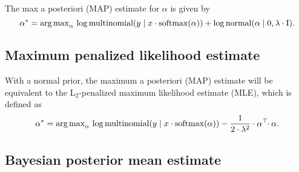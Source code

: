 \documentclass{article}
\begin{document}
The max a posteriori (MAP) estimate for $\alpha$ is given by
\[
  \alpha^* = \textrm{arg\,max}_{\alpha} \,
  \log \textrm{multinomial}(y \mid x \cdot \textrm{softmax}(\alpha))
  + \log \textrm{normal}(\alpha \mid 0, \lambda \cdot \textrm{I}).
\]

\subsection{Maximum penalized likelihood estimate}

With a normal prior, the maximum a posteriori (MAP) estimate will be
equivalent to the $\textrm{L}_2$-penalized maximum likelihood estimate
(MLE), which is defined as
\[
  \alpha^* = \textrm{arg\,max}_{\alpha} \,
  \log \textrm{multinomial}(y \mid x \cdot \textrm{softmax}(\alpha))
  - \frac{1}{2 \cdot \lambda^2} \cdot \alpha^{\top}\!\! \cdot \alpha.
\]

\subsection{Bayesian posterior mean estimate}
\end{document}
